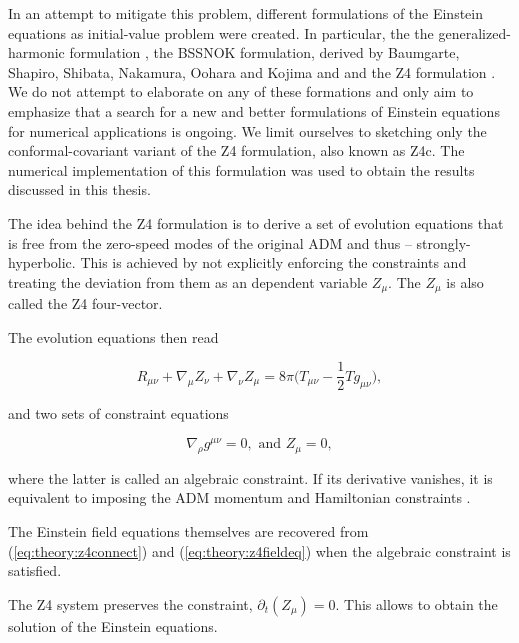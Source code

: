 \documentclass[11pt,a4paper,headinclude=true,DIV=14,BCOR=8mm,chapterprefix,listof=totoc,twoside,openright,abstracton]{scrbook}
\begin{document}
In an attempt to mitigate this problem, different formulations of the Einstein equations as initial-value problem were created. In particular, the the generalized-harmonic formulation \cite{Friedrich:1985,Lindblom:2005qh,Lindblom:2009}, the BSSNOK formulation, derived by Baumgarte, Shapiro, Shibata, Nakamura, Oohara and Kojima \cite{Nakamura1987,Shibata:1995we,Baumgarte:1998te} and and the Z4 formulation \cite{Bona:2003fj,Bernuzzi:2009ex,Ruiz:2010qj,Weyhausen:2011cg,Alic:2011gg}. We do not attempt to elaborate on any of these formations and only aim to emphasize that a search for a new and better formulations of Einstein equations for numerical applications is ongoing. We limit ourselves to sketching only the conformal-covariant variant of the Z4 formulation, also known as Z4c. The numerical implementation of this formulation was used to obtain the results discussed in this thesis. 


The idea behind the Z4 formulation is to derive a set of evolution equations that is free from the zero-speed modes of the original ADM and thus -- strongly-hyperbolic. This is achieved by not explicitly enforcing the constraints and treating the deviation from them as an dependent variable $Z_{\mu}$. The $Z_{\mu}$ is also called the Z4 four-vector.

The evolution equations then read

\begin{equation}
R_{\mu\nu} + \nabla_{\mu}Z_{\nu} + \nabla_{\nu}Z_{\mu}=8\pi\Big(T_{\mu\nu} - \frac{1}{2}Tg_{\mu\nu}\Big),
\label{eq:theory:z4fieldeq}
\end{equation}

and two sets of constraint equations

\begin{equation}
\nabla_{\rho} g^{\mu\nu} = 0, \text{ and } Z_{\mu} = 0,
\label{eq:theory:z4connect}
\end{equation}

where the latter is called an algebraic constraint. If its derivative vanishes, it is equivalent to imposing the ADM momentum and Hamiltonian constraints \cite{Bona:2009}. 

The Einstein field equations themselves are recovered from (\ref{eq:theory:z4connect}) and (\ref{eq:theory:z4fieldeq}) when the algebraic constraint is satisfied. 

The Z4 system preserves the constraint, $\partial_t (Z_{\mu})= 0$. This allows to obtain the solution of the Einstein equations. 
\end{document}
